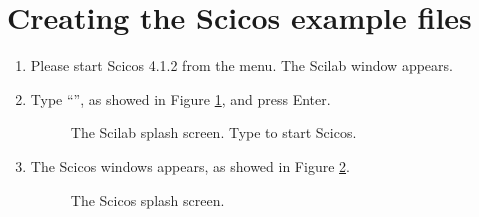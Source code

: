 \section{Creating the Scicos example files}

\begin{enumerate}
\item
  Please start Scicos 4.1.2 from the  menu. The Scilab
  window appears.

\item
  Type ``'', as showed in Figure
  \ref{fig:scilab_splash}, and press Enter.
%
\begin{figure}[htb]
\caption{The Scilab splash screen. Type  to start Scicos.}
\label{fig:scilab_splash}
\end{figure}

\item
  The Scicos windows appears, as showed in Figure
  \ref{fig:scicos_splash}.
%
\begin{figure}[htb]
\caption{The Scicos splash screen.}
\label{fig:scicos_splash}
\end{figure}


\end{enumerate}
